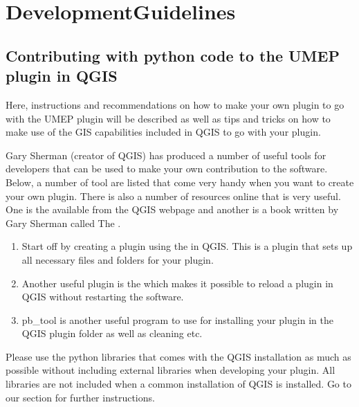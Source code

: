 \documentclass[letterpaper,10pt,english]{sphinxmanual}
\begin{document}
\chapter{DevelopmentGuidelines}
\label{\detokenize{DevelopmentGuidelines:developmentguidelines}}\label{\detokenize{DevelopmentGuidelines:id1}}\label{\detokenize{DevelopmentGuidelines::doc}}

\section{Contributing with python code to the UMEP plugin in QGIS}
\label{\detokenize{DevelopmentGuidelines:contributing-with-python-code-to-the-umep-plugin-in-qgis}}
Here, instructions and recommendations on how to make your own plugin to
go with the UMEP plugin will be described as well as tips and tricks on
how to make use of the GIS capabilities included in QGIS to go with your
plugin.

Gary Sherman (creator of QGIS) has produced a number of useful tools for
developers that can be used to make your own contribution to the
software. Below, a number of tool are listed that come very handy when
you want to create your own plugin. There is also a number of resources
online that is very useful. One is the 
available from the QGIS webpage and another is a book written by Gary
Sherman called The .
\begin{enumerate}
\item {} 
Start off by creating a plugin using the  in QGIS.
This is a plugin that sets up all necessary files and folders for
your plugin.

\item {} 
Another useful plugin is the  which makes it
possible to reload a plugin in QGIS without restarting the software.

\item {} 
pb\_tool is another useful program to use for installing your plugin
in the QGIS plugin folder as well as cleaning etc.

\end{enumerate}

Please use the python libraries that comes with the QGIS installation as
much as possible without including external libraries when developing
your plugin. All libraries are not included when a common installation
of QGIS is installed. Go to our 
section for further instructions.
\end{document}
